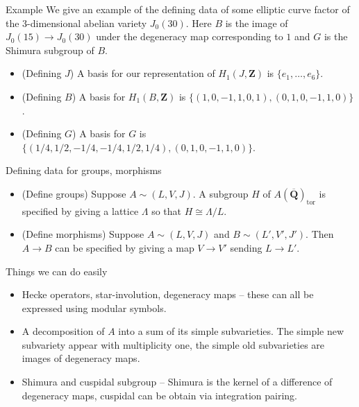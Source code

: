 \documentclass{beamer}
\newcommand{\QQbar}{\overline{\mathbf{Q}}}
\newcommand{\ZZ}{\mathbf{Z}}
\renewcommand{\ZZ}{\mathbf{Z}}
\newcommand{\tor}{\mathrm{tor}}
\begin{document}
\begin{frame}{Example}
    We give an example of the defining data of some elliptic curve factor of
    the 3-dimensional abelian variety $J_0(30)$. Here $B$ is the image of
    $J_0(15)\to J_0(30)$ under the degeneracy map corresponding to $1$ and $G$
    is the Shimura subgroup of $B$.
    \begin{itemize}
        \item
            (Defining $J$) A basis for our representation of $H_1(J, \ZZ)$ is
            $\{e_1,\ldots,e_6\}$.
        \item
            (Defining $B$) A basis for $H_1(B, \ZZ)$ is $\{(1,0,-1,1,0,1),
            (0,1,0,-1,1,0)\}$.
        \item
            (Defining $G$) A basis for $G$ is $\{(1/4, 1/2, -1/4, -1/4, 1/2,
            1/4), (0,1,0,-1,1,0)\}$.
    \end{itemize}
\end{frame}

\begin{frame}{Defining data for groups, morphisms}
    \begin{itemize}
        \item 
            (Define groups) Suppose $A\sim (L, V, J)$. A subgroup $H$ of
            $A(\QQbar)_\tor$ is specified by giving a lattice $\Lambda$ so that
            $H\cong \Lambda/L$. 
        \item
            (Define morphisms) Suppose $A\sim (L, V, J)$ and $B\sim (L', V', J')$.
            Then $A\to B$ can be specified by giving a map $V\to V'$ sending
            $L\to L'$.
    \end{itemize}

\end{frame}

\begin{frame}{Things we can do easily}
    \begin{itemize}
        \item
            Hecke operators, star-involution, degeneracy maps -- these can all
            be expressed using modular symbols.
        \item
            A decomposition of $A$ into a sum of its simple subvarieties. The
            simple new subvariety appear with multiplicity one, the simple old
            subvarieties are images of degeneracy maps.
        \item 
            Shimura and cuspidal subgroup -- Shimura is the kernel of a
            difference of degeneracy maps, cuspidal can be obtain via
            integration pairing.
    \end{itemize}
\end{frame}
\end{document}
